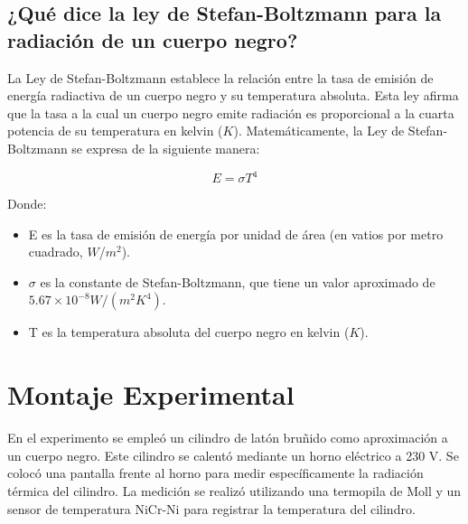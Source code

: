 \documentclass[letterpaper, 12pt]{article}
\begin{document}
\subsection{¿Qué dice la ley de Stefan-Boltzmann para la radiación de un cuerpo negro?~\cite{Stefan_Boltzmann_Law}}

La Ley de Stefan-Boltzmann establece la relación entre la
tasa de emisión de energía radiactiva de un cuerpo negro y
su temperatura absoluta. Esta ley afirma que la tasa a la
cual un cuerpo negro emite radiación es proporcional a la
cuarta potencia de su temperatura en kelvin ($K$).
Matemáticamente, la Ley de Stefan-Boltzmann se expresa de
la siguiente manera:

\begin{equation*}
      E = \sigma T^{4}
\end{equation*}

Donde:

\begin{itemize}
      \item E es la tasa de emisión de energía por unidad de área (en
            vatios por metro cuadrado, $W$/$m^2$).

      \item $\sigma$ es la constante de Stefan-Boltzmann, que tiene un
            valor aproximado de $5.67 \times 10^{-8} W/(m^{2}K^{4})$.

      \item T es la temperatura absoluta del cuerpo negro en kelvin
            ($K$).
\end{itemize}

\section{Montaje Experimental}

En el experimento se empleó un cilindro de latón bruñido
como aproximación a un cuerpo negro. Este cilindro se
calentó mediante un horno eléctrico a 230 V. Se colocó una
pantalla frente al horno para medir específicamente la
radiación térmica del cilindro. La medición se realizó
utilizando una termopila de Moll y un sensor de temperatura
NiCr-Ni para registrar la temperatura del cilindro.
\end{document}
